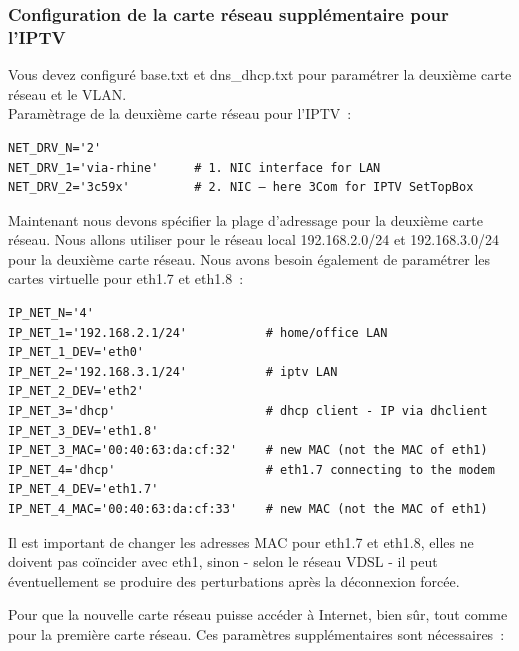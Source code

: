 \subsubsection{Configuration de la carte réseau supplémentaire pour l'IPTV}

Vous devez configuré base.txt et dns\_dhcp.txt pour paramétrer la deuxième carte réseau et le VLAN.\\

\noindent Paramètrage de la deuxième carte réseau pour l'IPTV~:\\

\begin{example}
\begin{verbatim}
NET_DRV_N='2'
NET_DRV_1='via-rhine'     # 1. NIC interface for LAN
NET_DRV_2='3c59x'         # 2. NIC – here 3Com for IPTV SetTopBox
\end{verbatim}
\end{example}

Maintenant nous devons spécifier la plage d'adressage pour la deuxième carte réseau. Nous allons utiliser
pour le réseau local 192.168.2.0/24 et 192.168.3.0/24 pour la deuxième carte réseau. Nous avons besoin
également de paramétrer les cartes virtuelle pour eth1.7 et eth1.8~:\\

\begin{example}
\begin{verbatim}
IP_NET_N='4'
IP_NET_1='192.168.2.1/24'           # home/office LAN
IP_NET_1_DEV='eth0'
IP_NET_2='192.168.3.1/24'           # iptv LAN
IP_NET_2_DEV='eth2'
IP_NET_3='dhcp'                     # dhcp client - IP via dhclient
IP_NET_3_DEV='eth1.8'
IP_NET_3_MAC='00:40:63:da:cf:32'    # new MAC (not the MAC of eth1)
IP_NET_4='dhcp'                     # eth1.7 connecting to the modem
IP_NET_4_DEV='eth1.7'
IP_NET_4_MAC='00:40:63:da:cf:33'    # new MAC (not the MAC of eth1)
\end{verbatim}
\end{example}

Il est important de changer les adresses MAC pour eth1.7 et eth1.8, elles ne doivent pas coïncider
avec eth1, sinon - selon le réseau VDSL - il peut éventuellement se produire des perturbations
après la déconnexion forcée.

Pour que la nouvelle carte réseau puisse accéder à Internet, bien sûr, tout comme pour la première
carte réseau. Ces paramètres supplémentaires sont nécessaires~: \\

